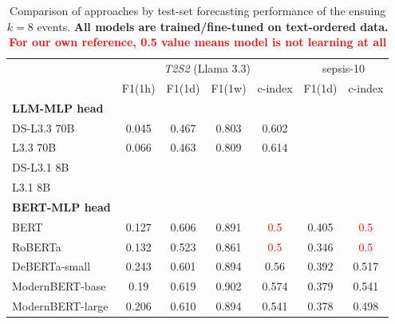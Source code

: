 \begin{table}[tb!]
\caption{Comparison of approaches by test-set forecasting performance of the ensuing $k=8$ events. \textbf{All models are trained/fine-tuned on text-ordered data. \textcolor{red}{For our own reference, 0.5 value means model is not learning at all}}}
\label{tab:results}
\small
\centering
\begin{tabular}{lcccccc}
\toprule
& \multicolumn{4}{c}{\textit{T2S2} (Llama 3.3)} & \multicolumn{2}{c}{sepsis-10}\\
& F1(1h) & F1(1d) & F1(1w) & c-index & F1(1d) & c-index\\
\midrule
\textbf{LLM-MLP head} &&&& &&\\
\quad DS-L3.3 70B & 0.045 & 0.467& 0.803 & 0.602 & & \\
\quad L3.3 70B   & 0.066 & 0.463 & 0.809 & 0.614 & & \\
\quad DS-L3.1 8B & & & & & & \\
\quad L3.1 8B & & & & & & \\
\textbf{BERT-MLP head} &&&& &&\\
\quad BERT & 0.127 & 0.606 & 0.891 & \textcolor{red}{0.5} & 0.405 & \textcolor{red}{0.5}\\
\quad RoBERTa & 0.132 & 0.523 & 0.861 & \textcolor{red}{0.5} & 0.346 & \textcolor{red}{0.5}\\
\quad DeBERTa-small  & 0.243 & 0.601 & 0.894 & 0.56 & 0.392 & 0.517\\
\quad ModernBERT-base & 0.19 & 0.619 & 0.902 & 0.574 & 0.379 & 0.541\\
\quad ModernBERT-large & 0.206 & 0.610 & 0.894 & 0.541 & 0.378 & 0.498\\
\bottomrule
\end{tabular}
\end{table}
